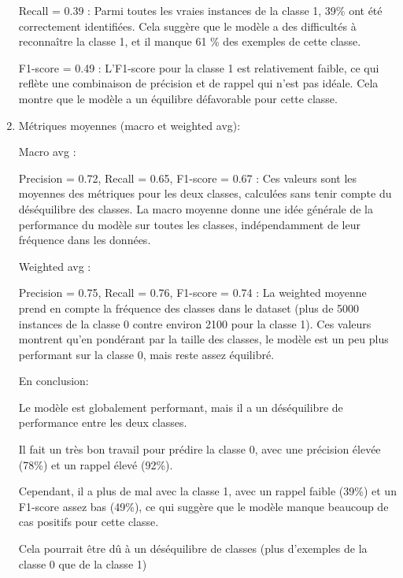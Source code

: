 \begin{flushleft}
\begin{enumerate}
Recall = 0.39 :
Parmi toutes les vraies instances de la classe 1, 39\% ont été correctement identifiées. Cela suggère que le modèle a des difficultés à reconnaître la classe 1, et il manque 61 \% des exemples de cette classe.

F1-score = 0.49 :
L'F1-score pour la classe 1 est relativement faible, ce qui reflète une combinaison de précision et de rappel qui n'est pas idéale. Cela montre que le modèle a un équilibre défavorable pour cette classe.

\item Métriques moyennes (macro et weighted avg):

Macro avg :

Precision = 0.72, Recall = 0.65, F1-score = 0.67 :
Ces valeurs sont les moyennes des métriques pour les deux classes, calculées sans tenir compte du déséquilibre des classes. La macro moyenne donne une idée générale de la performance du modèle sur toutes les classes, indépendamment de leur fréquence dans les données.


Weighted avg :

Precision = 0.75, Recall = 0.76, F1-score = 0.74 :
La weighted moyenne prend en compte la fréquence des classes dans le dataset (plus de 5000 instances de la classe 0 contre environ 2100 pour la classe 1). Ces valeurs montrent qu'en pondérant par la taille des classes, le modèle est un peu plus performant sur la classe 0, mais reste assez équilibré.

En conclusion:

Le modèle est globalement performant, mais il a un déséquilibre de performance entre les deux classes. 

Il fait un très bon travail pour prédire la classe 0, avec une précision élevée (78\%) et un rappel élevé (92\%).

Cependant, il a plus de mal avec la classe 1, avec un rappel faible (39\%) et un F1-score assez bas (49\%), ce qui suggère que le modèle manque beaucoup de cas positifs pour cette classe.

Cela pourrait être dû à un déséquilibre de classes (plus d'exemples de la classe 0 que de la classe 1)
\end{enumerate}
\end{flushleft}

